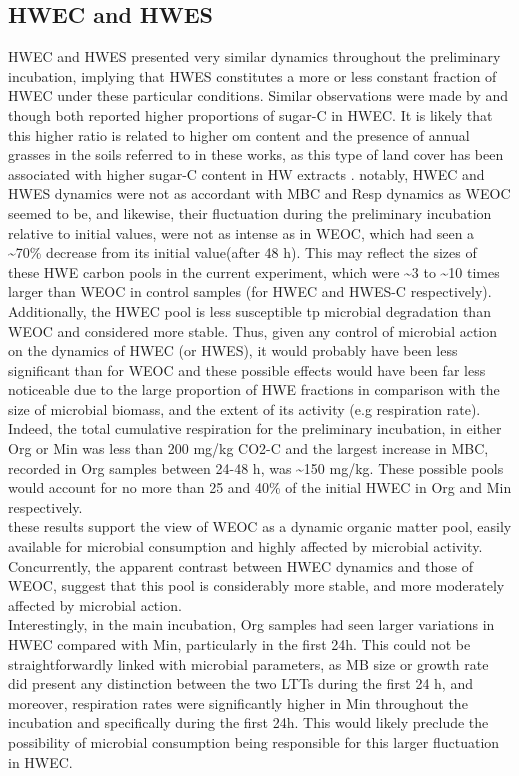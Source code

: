 	\subsection{HWEC and HWES}
	HWEC and HWES presented very similar dynamics throughout the preliminary incubation, implying that HWES constitutes  a more or less constant fraction of HWEC under these particular conditions. Similar observations were made by \citet{haynes2005} and \citet{ghani2000, ghani2003} though both reported higher proportions of sugar-C in HWEC. It is likely that this higher ratio is related to higher \gls{om} content and the presence of annual grasses in the soils referred to in these works, as this type of land cover has been associated with higher sugar-C content in HW extracts \citep{haynes1993}.
	notably, HWEC and HWES dynamics were not as accordant with MBC and Resp dynamics as WEOC seemed to be, and likewise, their fluctuation during the preliminary incubation relative to initial values, were not as intense as in WEOC, which had seen a \~{}70\% decrease from its initial value(after 48 h). This may reflect the sizes of these HWE carbon pools in the current experiment, which were \~{}3 to \~{}10 times larger than WEOC in control samples (for HWEC and HWES-C respectively). Additionally, the HWEC pool is less susceptible tp microbial degradation than WEOC and  considered more stable. Thus, given any control of microbial action on the dynamics of HWEC (or HWES), it would probably have been less significant than for WEOC and these possible effects would have been far less noticeable due to the large proportion of HWE fractions in comparison with the size of microbial biomass, and the extent of its activity (e.g respiration rate). Indeed, the total cumulative respiration  for the preliminary incubation, in either Org or Min was less than 200 mg/kg CO2-C and the largest increase in MBC, recorded in Org samples between 24-48 h, was \~{}150 mg/kg. These possible pools would account for no more than 25 and 40\% of the initial HWEC in Org and Min respectively. \\
	these results support the view of WEOC as a dynamic organic matter pool, easily available for microbial consumption and highly affected by microbial activity. Concurrently, the apparent contrast between HWEC dynamics and those of WEOC, suggest that this pool is considerably more stable, and more moderately affected by microbial action.\\
	Interestingly, in the main incubation, Org samples had seen larger variations in HWEC compared with Min, particularly in the first 24h. This could not be straightforwardly linked with microbial parameters, as MB size or growth rate did present any distinction between the two LTTs during the first 24 h, and moreover, respiration rates were significantly higher in Min throughout the incubation and specifically during the first 24h. This would likely preclude the possibility of microbial consumption being responsible for this larger fluctuation in HWEC.\\
